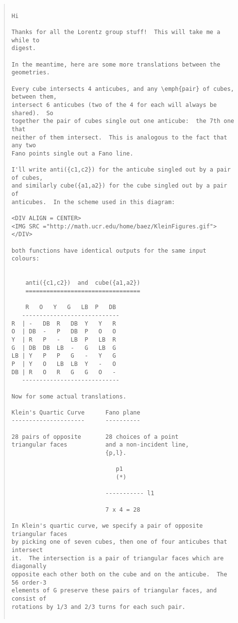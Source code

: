 \begin{quote}

\begin{verbatim}

Hi

Thanks for all the Lorentz group stuff!  This will take me a while to 
digest.

In the meantime, here are some more translations between the geometries.

Every cube intersects 4 anticubes, and any \emph{pair} of cubes, between them, 
intersect 6 anticubes (two of the 4 for each will always be shared).  So 
together the pair of cubes single out one anticube:  the 7th one that 
neither of them intersect.  This is analogous to the fact that any two 
Fano points single out a Fano line.

I'll write anti({c1,c2}) for the anticube singled out by a pair of cubes, 
and similarly cube({a1,a2}) for the cube singled out by a pair of 
anticubes.  In the scheme used in this diagram:

<DIV ALIGN = CENTER>
<IMG SRC ="http://math.ucr.edu/home/baez/KleinFigures.gif">
</DIV>

both functions have identical outputs for the same input colours:


    anti({c1,c2})  and  cube({a1,a2})
    =================================

    R   O   Y   G   LB  P   DB
   ----------------------------
R  | -   DB  R   DB  Y   Y   R
O  | DB  -   P   DB  P   O   O
Y  | R   P   -   LB  P   LB  R
G  | DB  DB  LB  -   G   LB  G
LB | Y   P   P   G   -   Y   G
P  | Y   O   LB  LB  Y   -   O
DB | R   O   R   G   G   O   -
   ----------------------------

Now for some actual translations.

Klein's Quartic Curve      Fano plane
---------------------      ----------

28 pairs of opposite       28 choices of a point
triangular faces           and a non-incident line,
                           {p,l}.

                              p1
                              (*)

                           ----------- l1

                           7 x 4 = 28

In Klein's quartic curve, we specify a pair of opposite triangular faces 
by picking one of seven cubes, then one of four anticubes that intersect 
it.  The intersection is a pair of triangular faces which are diagonally 
opposite each other both on the cube and on the anticube.  The 56 order-3 
elements of G preserve these pairs of triangular faces, and consist of 
rotations by 1/3 and 2/3 turns for each such pair.


\end{verbatim}
\end{quote}

